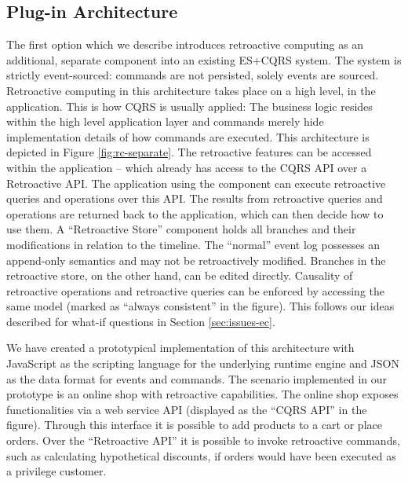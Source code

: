 \subsection{Plug-in Architecture}
\label{sec:arch:arch-plugin}
The first option which we describe introduces retroactive computing as an 
additional, separate component into an existing ES+CQRS system. The system 
is strictly event-sourced: commands are not persisted, solely events are 
sourced. Retroactive computing in this architecture takes place on a high 
level, in the application.
This is how CQRS is usually applied: The business logic resides within the 
high level application layer and commands merely hide implementation details 
of how commands are executed.
This architecture is depicted in Figure \ref{fig:rc-separate}.
%
The retroactive features can be accessed within the application -- which 
already has access to the CQRS API over a Retroactive API.
The application using the component can execute retroactive queries and 
operations over this API.
%
The results from retroactive queries and operations are returned back to the
application, which can then decide how to use them.
A ``Retroactive Store'' component holds all branches and their modifications in
relation to the timeline. The ``normal'' event log possesses an append-only 
semantics and may not be retroactively modified. Branches in the retroactive 
store, on the other hand, can be edited directly. Causality of retroactive 
operations and retroactive queries can be enforced by accessing the same model 
(marked as ``always consistent'' in the figure). 
This follows our ideas described for what-if questions in Section \ref{sec:issues-ec}.

We have created a prototypical implementation of this architecture with JavaScript 
as the scripting language for the underlying runtime engine and JSON as the 
data format for events and commands. The scenario implemented in our prototype 
is an online shop with retroactive capabilities.
The online shop exposes functionalities via a web service API (displayed as the 
``CQRS API'' in the figure).
Through this interface it is possible to add products to a cart or place orders.
Over the ``Retroactive API'' it is possible to invoke retroactive commands, such 
as calculating hypothetical discounts, if orders would have been executed as a
privilege customer. %

